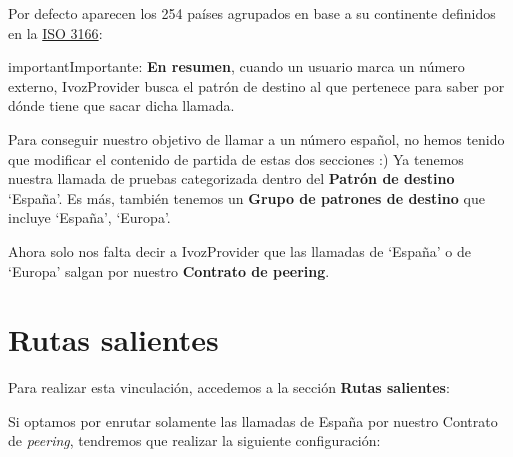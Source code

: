 \documentclass[letterpaper,10pt,spanish]{sphinxmanual}
\begin{document}

Por defecto aparecen los 254 países agrupados en base a su continente definidos en la \href{https://es.wikipedia.org/wiki/ISO\_3166}{ISO 3166}:


\begin{notice}{important}{Importante:}
\textbf{En resumen}, cuando un usuario marca un número externo, IvozProvider busca el patrón de destino al que pertenece para saber por dónde tiene que sacar dicha llamada.
\end{notice}

Para conseguir nuestro objetivo de llamar a un número español, no hemos tenido que modificar el contenido de partida de estas dos secciones :)
\label{external_outgoing_calls/call_routing:outgoing-routes}
Ya tenemos nuestra llamada de pruebas categorizada dentro del \textbf{Patrón de destino} `España'. Es más, también tenemos un \textbf{Grupo de patrones de destino} que incluye `España', `Europa'.

Ahora solo nos falta decir a IvozProvider que las llamadas de `España' o de `Europa' salgan por nuestro \textbf{Contrato de peering}.


\section{Rutas salientes}
\label{external_outgoing_calls/call_routing:rutas-salientes}\label{external_outgoing_calls/call_routing::doc}
Para realizar esta vinculación, accedemos a la sección \textbf{Rutas salientes}:


Si optamos por enrutar solamente las llamadas de España por nuestro Contrato de \emph{peering}, tendremos que realizar la siguiente configuración:

\end{document}
